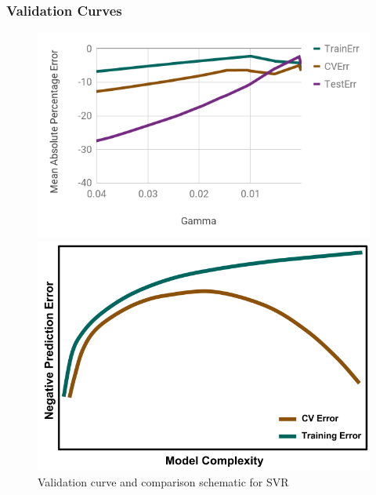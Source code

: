 \begin{frame}
  \frametitle{Validation Curves}
  \begin{figure}
    \begin{minipage}{0.65\textwidth}
      \centering
      \includegraphics[width=\linewidth]{./figures/vc1.png}
    \end{minipage}%
    \begin{minipage}{0.4\textwidth}
      \centering
      \includegraphics[width=\linewidth]{./figures/NegValidCurve.png}
    \end{minipage}
    \caption{Validation curve and comparison schematic for SVR}
  \end{figure}
\end{frame}

